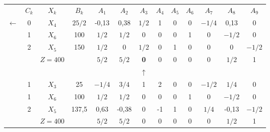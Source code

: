     \begin{tabular}{ccccccccccccc}
\cline{2-13}            & $C_k$   & $X_k$   & $B_k$   & $A_1$   & $A_2$   & $A_3$   & $A_4$   & $A_5$   & $A_6$   & $A_7$   & $A_8$   & $A_9$ \bigstrut\\
\cline{2-13}    $\leftarrow$ & 0       & \textcolor[rgb]{ 1,  0,  0}{\boldmath{}\textbf{$X_4$}\unboldmath{}} & $25/2$  & -0,13   & 0,38    & \boldmath{}\textbf{$1/2$}\unboldmath{} & 1       & 0       & 0       & $-1/4$  & 0,13    & 0 \bigstrut[t]\\
            & 1       & $X_6$   & 100     & $1/2$   & $1/2$   & 0       & 0       & 0       & 1       & 0       & $-1/2$  & 0 \\
            & 2       & $X_5$   & 150     & $1/2$   & 0       & $1/2$   & 0       & 1       & 0       & 0       & 0       & $-1/2$ \bigstrut[b]\\
\cline{2-13}            &         & $Z=400$ &         & $5/2$   & $5/2$   & \textcolor[rgb]{ 0,  .439,  .753}{\textbf{0}} & 0       & 0       & 0       & 0       & $1/2$   & 1 \bigstrut\\
\cline{2-13}            &         &         &         &         &         & $\uparrow$ &         &         &         &         &         &  \bigstrut\\
\cline{2-13}            & 1       & $X_3$   & 25      & $-1/4$  & $3/4$   & 1       & 2       & 0       & 0       & $-1/2$  & $1/4$   & 0 \bigstrut[t]\\
            & 1       & $X_6$   & 100     & $1/2$   & $1/2$   & 0       & 0       & 0       & 1       & 0       & $-1/2$  & 0 \\
            & 2       & $X_5$   & 137,5   & 0,63    & -0,38   & 0       & -1      & 1       & 0       & $1/4$   & -0,13   & $-1/2$ \bigstrut[b]\\
\cline{2-13}            &         & $Z=400$ &         & $5/2$   & $5/2$   & 0       & 0       & 0       & 0       & 0       & $1/2$   & 1 \bigstrut\\
\cline{2-13}    \end{tabular}%
